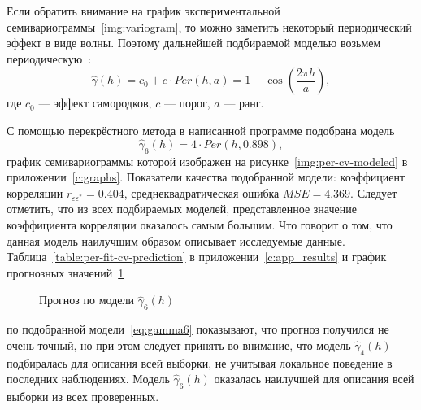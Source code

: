 Если обратить внимание на график экспериментальной семивариограммы~\ref{img:variogram}, то можно заметить некоторый периодический эффект в виде волны. Поэтому дальнейшей подбираемой моделью возьмем периодическую~\cite{pebesma2001gstat}:
\begin{equation}
\label{eq:per}
	\widehat{\gamma}(h) = c_0 + c \cdot Per(h, a) = 1 - \cos(\frac{2 \pi h}{a}),
\end{equation}
где $ c_0 $ --- эффект самородков, $ c $ --- порог, $ a $ --- ранг.

С помощью перекрёстного метода в написанной программе подобрана модель
\begin{equation}
\label{eq:gamma6}
	\widehat{\gamma}_6(h) = 4 \cdot Per(h, 0.898),
\end{equation}
график семивариограммы которой изображен на рисунке~\ref{img:per-cv-modeled} в приложении~\ref{c:graphs}. Показатели качества подобранной модели: коэффициент корреляции $ r_{\varepsilon\varepsilon^{*}} = 0.404 $, среднеквадратическая ошибка $ MSE = 4.369 $. Следует отметить, что из всех подбираемых моделей, представленное значение коэффициента корреляции оказалось самым большим. Что говорит о том, что данная модель наилучшим образом описывает исследуемые данные. Таблица~\ref{table:per-fit-cv-prediction} в приложении~\ref{c:app_results} и график прогнозных значений~\ref{img:per-cv-pred}
\begin{figure}[ht]
\caption{Прогноз по модели $ \widehat{\gamma}_6(h) $}
\label{img:per-cv-pred}
\end{figure}
по подобранной модели~\eqref{eq:gamma6} показывают, что прогноз получился не очень точный, но при этом следует принять во внимание, что модель $ \widehat{\gamma}_4(h) $ подбиралась для описания всей выборки, не учитывая локальное поведение в последних наблюдениях. Модель $ \widehat{\gamma}_6(h) $ оказалась наилучшей для описания всей выборки из всех проверенных.

